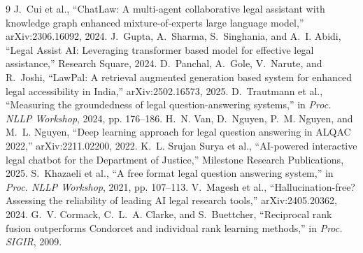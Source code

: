 \documentclass[conference]{IEEEtran}
\begin{document}
\begin{thebibliography}{9}
 J.~Cui et al., ``ChatLaw: A multi-agent collaborative legal assistant with knowledge graph enhanced mixture-of-experts large language model,'' arXiv:2306.16092, 2024.
 J.~Gupta, A.~Sharma, S.~Singhania, and A.~I. Abidi, ``Legal Assist AI: Leveraging transformer based model for effective legal assistance,'' Research Square, 2024.
 D.~Panchal, A.~Gole, V.~Narute, and R.~Joshi, ``LawPal: A retrieval augmented generation based system for enhanced legal accessibility in India,'' arXiv:2502.16573, 2025.
 D.~Trautmann et al., ``Measuring the groundedness of legal question-answering systems,'' in \emph{Proc. NLLP Workshop}, 2024, pp. 176--186.
 H.~N. Van, D.~Nguyen, P.~M. Nguyen, and M.~L. Nguyen, ``Deep learning approach for legal question answering in ALQAC 2022,'' arXiv:2211.02200, 2022.
 K.~L. Srujan Surya et al., ``AI-powered interactive legal chatbot for the Department of Justice,'' Milestone Research Publications, 2025.
 S.~Khazaeli et al., ``A free format legal question answering system,'' in \emph{Proc. NLLP Workshop}, 2021, pp. 107--113.
 V.~Magesh et al., ``Hallucination-free? Assessing the reliability of leading AI legal research tools,'' arXiv:2405.20362, 2024.
 G.~V. Cormack, C.~L.~A. Clarke, and S.~Buettcher, ``Reciprocal rank fusion outperforms Condorcet and individual rank learning methods,'' in \emph{Proc. SIGIR}, 2009.
\end{thebibliography}
\end{document}
